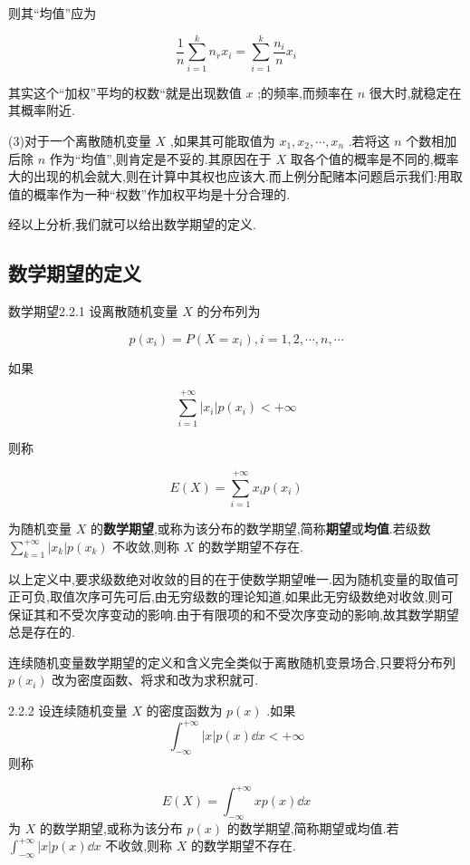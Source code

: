 则其“均值”应为

\[ 
\frac{1}{n} \sum_{i=1}^{k} n_{\dot{r}} x_{i}=\sum_{i=1}^{k} \frac{n_{i}}{n} x_{i}
\]

其实这个“加权”平均的权数“就是出现数值 $ x $ ;的频率,而频率在 $ n $ 很大时,就稳定在其概率附近.

(3)对于一个离散随机变量 $ X $ ,如果其可能取值为 $ x_{1}, x_{2}, \cdots, x_{n} $ .若将这 $ n $ 个数相加后除 $ n $ 作为“均值”,则肯定是不妥的.其原因在于 $ X $ 取各个值的概率是不同的,概率大的出现的机会就大,则在计算中其权也应该大.而上例分配赌本问题启示我们:用取值的概率作为一种“权数”作加权平均是十分合理的.

经以上分析,我们就可以给出数学期望的定义.

\subsection{数学期望的定义}\label{ssec:2.2.2}

\begin{definition}{数学期望}{2.2.1}
	设离散随机变量 $ X $ 的分布列为
	
	\[ 
	p\left(x_{i}\right)=P\left(X=x_{i}\right), i=1,2, \cdots, n, \cdots
	\]
	
	如果
	
	\[ 
	\sum_{i=1}^{+\infty}\left|x_{i}\right| p\left(x_{i}\right)<+\infty
	\]
	
	则称
	
	\begin{equation} 
	E(X)=\sum_{i=1}^{+\infty} x_{i} p\left(x_{i}\right) \label{eq:2.2.1}
	\end{equation}
	
	为随机变量 $ X $ 的\textbf{数学期望},或称为该分布的数学期望,简称\textbf{期望}或\textbf{均值}.若级数 $ \sum_{k=1}^{+\infty}\left|x_{k}\right| p\left(x_{k}\right) $ 不收敛,则称 $ X $ 的数学期望不存在.
\end{definition}

以上定义中,要求级数绝对收敛的目的在于使数学期望唯一.因为随机变量的取值可正可负,取值次序可先可后,由无穷级数的理论知道,如果此无穷级数绝对收敛,则可保证其和不受次序变动的影响.由于有限项的和不受次序变动的影响,故其数学期望总是存在的.

连续随机变量数学期望的定义和含义完全类似于离散随机变景场合,只要将分布列 $ p(x_i) $ 改为密度函数、将求和改为求积就可.

\begin{definition}{}{2.2.2}
	设连续随机变量 $ X $ 的密度函数为 $ p(x) $ .如果
	\[ 
	\int_{-\infty}^{+\infty}|x| p(x) \dd x<+\infty
	\]
	则称
	
	\begin{equation} 
	E(X)=\int_{-\infty}^{+\infty} x p(x) \dd x \label{eq:2.2.2}
	\end{equation}
	为 $ X $ 的数学期望,或称为该分布 $ p(x) $ 的数学期望,简称期望或均值.若 $ \int_{-\infty}^{+\infty}|x| p(x) \dd x $ 不收敛,则称 $ X $ 的数学期望不存在.
	
\end{definition}


